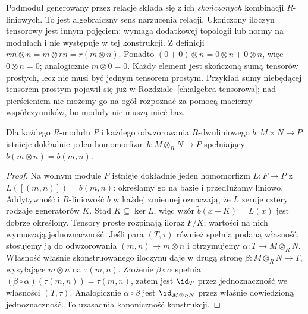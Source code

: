 Podmoduł generowany przez relacje składa się
z ich \emph{skończonych} kombinacji $R$-liniowych.
To jest algebraiczny sens narzucenia relacji.
Ukończony iloczyn tensorowy jest innym pojęciem:
wymaga dodatkowej topologii lub normy na modułach
i nie występuje w tej konstrukcji.
Z definicji
$rm\otimes n=m\otimes rn=r(m\otimes n)$.
Ponadto $(0+0)\otimes n=0\otimes n+0\otimes n$,
więc $0\otimes n=0$; analogicznie $m\otimes0=0$.
Każdy element jest skończoną sumą tensorów
prostych, lecz nie musi być jednym tensorem prostym.
Przykład sumy niebędącej tensorem prostym pojawił się już
w Rozdziale~\ref{ch:algebra-tensorowa}; nad pierścieniem
nie możemy go na ogół rozpoznać za pomocą macierzy
współczynników, bo moduły nie muszą mieć baz.

\begin{twierdzenie}
\label{thm:tensor-modulow-uniwersalnosc}
Dla każdego $R$-modułu $P$ i każdego
odwzorowania $R$-dwuliniowego
$b:M\times N\to P$ istnieje dokładnie
jeden homomorfizm $\widetilde b:M\otimes_R N\to P$
spełniający $\widetilde b(m\otimes n)=b(m,n)$.
\end{twierdzenie}
\begin{proof}
Na wolnym module $F$ istnieje dokładnie
jeden homomorfizm $L:F\to P$ z
$L([(m,n)])=b(m,n)$: określamy go na bazie
i przedłużamy liniowo. Addytywność i
$R$-liniowość $b$ w każdej zmiennej oznaczają,
że $L$ zeruje cztery rodzaje generatorów $K$.
Stąd $K\subseteq\ker L$, więc wzór
$\widetilde b(x+K)=L(x)$ jest dobrze określony.
Tensory proste rozpinają iloraz $F/K$;
wartości na nich wymuszają jednoznaczność.
Jeśli para $(T,\tau)$ również spełnia podaną własność,
stosujemy ją do odwzorowania $(m,n)\mapsto m\otimes n$
i otrzymujemy $\alpha:T\to M\otimes_R N$. Własność właśnie
skonstruowanego iloczynu daje w drugą stronę
$\beta:M\otimes_R N\to T$, wysyłające $m\otimes n$ na
$\tau(m,n)$. Złożenie $\beta\circ\alpha$ spełnia
$(\beta\circ\alpha)(\tau(m,n))=\tau(m,n)$, zatem
jest $\id_T$ przez jednoznaczność we własności $(T,\tau)$.
Analogicznie $\alpha\circ\beta$ jest $\id_{M\otimes_R N}$
przez właśnie dowiedzioną jednoznaczność.
To uzasadnia kanoniczność konstrukcji.
\end{proof}

